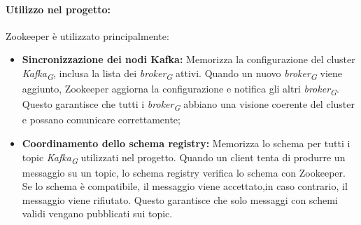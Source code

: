 \paragraph{Utilizzo nel progetto:}
Zookeeper è utilizzato principalmente:
\begin{itemize}
    \item \textbf{Sincronizzazione dei nodi Kafka:} Memorizza la configurazione del cluster \textit{Kafka}\textsubscript{\textit{G}}, inclusa la lista dei \textit{broker}\textsubscript{\textit{G}} attivi.
    Quando un nuovo \textit{broker}\textsubscript{\textit{G}} viene aggiunto, Zookeeper aggiorna la configurazione e notifica gli altri \textit{broker}\textsubscript{\textit{G}}.
    Questo garantisce che tutti i \textit{broker}\textsubscript{\textit{G}} abbiano una visione coerente del cluster e possano comunicare correttamente;
    \item \textbf{Coordinamento dello schema registry:} Memorizza lo schema per tutti i topic \textit{Kafka}\textsubscript{\textit{G}} utilizzati nel progetto.
    Quando un client tenta di produrre un messaggio su un topic, lo schema registry verifica lo schema con Zookeeper.
    Se lo schema è compatibile, il messaggio viene accettato,in caso contrario, il messaggio viene rifiutato.
    Questo garantisce che solo messaggi con schemi validi vengano pubblicati sui topic.
\end{itemize}
